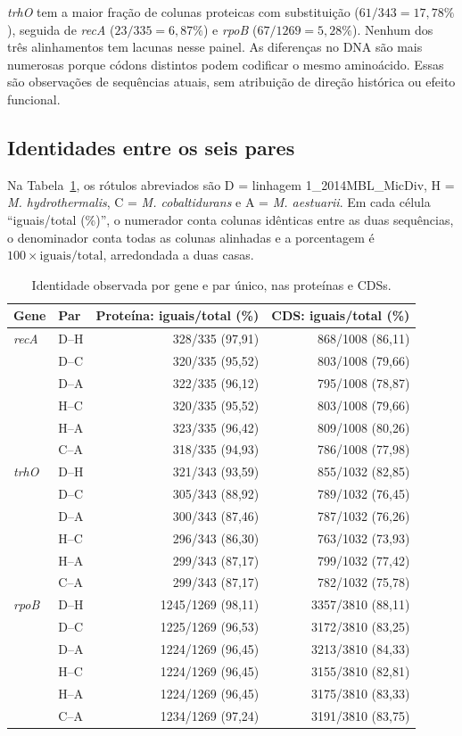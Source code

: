 \documentclass[12pt]{article}
\begin{document}
\textit{trhO} tem a maior fração de colunas proteicas com substituição
($61/343=17{,}78\%$), seguida de \textit{recA} ($23/335=6{,}87\%$) e
\textit{rpoB} ($67/1269=5{,}28\%$). Nenhum dos três alinhamentos tem lacunas
nesse painel. As diferenças no DNA são mais numerosas porque códons distintos
podem codificar o mesmo aminoácido. Essas são observações de sequências atuais,
sem atribuição de direção histórica ou efeito funcional.

\subsection{Identidades entre os seis pares}

Na Tabela~\ref{tab:pares}, os rótulos abreviados são D = linhagem
1\_2014MBL\_MicDiv, H = \textit{M. hydrothermalis}, C =
\textit{M. cobaltidurans} e A = \textit{M. aestuarii}. Em cada célula
``iguais/total (\%)'', o numerador conta colunas idênticas entre as duas
sequências, o denominador conta todas as colunas alinhadas e a porcentagem é
$100\times\mathrm{iguais}/\mathrm{total}$, arredondada a duas casas.

\begin{table}[ht]
\centering\small
\caption{Identidade observada por gene e par único, nas proteínas e CDSs.}
\label{tab:pares}
\begin{tabular}{llrr}
\hline
Gene & Par & Proteína: iguais/total (\%) & CDS: iguais/total (\%) \\
\hline
\textit{recA} & D--H & 328/335 (97,91) & 868/1008 (86,11) \\
 & D--C & 320/335 (95,52) & 803/1008 (79,66) \\
 & D--A & 322/335 (96,12) & 795/1008 (78,87) \\
 & H--C & 320/335 (95,52) & 803/1008 (79,66) \\
 & H--A & 323/335 (96,42) & 809/1008 (80,26) \\
 & C--A & 318/335 (94,93) & 786/1008 (77,98) \\
\hline
\textit{trhO} & D--H & 321/343 (93,59) & 855/1032 (82,85) \\
 & D--C & 305/343 (88,92) & 789/1032 (76,45) \\
 & D--A & 300/343 (87,46) & 787/1032 (76,26) \\
 & H--C & 296/343 (86,30) & 763/1032 (73,93) \\
 & H--A & 299/343 (87,17) & 799/1032 (77,42) \\
 & C--A & 299/343 (87,17) & 782/1032 (75,78) \\
\hline
\textit{rpoB} & D--H & 1245/1269 (98,11) & 3357/3810 (88,11) \\
 & D--C & 1225/1269 (96,53) & 3172/3810 (83,25) \\
 & D--A & 1224/1269 (96,45) & 3213/3810 (84,33) \\
 & H--C & 1224/1269 (96,45) & 3155/3810 (82,81) \\
 & H--A & 1224/1269 (96,45) & 3175/3810 (83,33) \\
 & C--A & 1234/1269 (97,24) & 3191/3810 (83,75) \\
\hline
\end{tabular}
\end{table}
\end{document}
